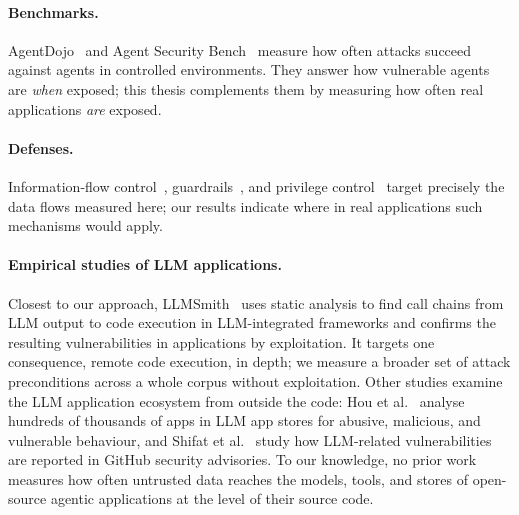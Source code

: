 \paragraph{Benchmarks.} AgentDojo~\cite{agentdojo} and Agent Security Bench~\cite{asb} measure how often attacks succeed against agents in controlled environments. They answer how vulnerable agents are \emph{when} exposed; this thesis complements them by measuring how often real applications \emph{are} exposed.

\paragraph{Defenses.} Information-flow control~\cite{debenedetti2025camel,costa2025fides}, guardrails~\cite{llamafirewall,xiang2024guardagent}, and privilege control~\cite{shi2025progent} target precisely the data flows measured here; our results indicate where in real applications such mechanisms would apply.

\paragraph{Empirical studies of LLM applications.} Closest to our approach, LLMSmith~\cite{liu2024llmsmith} uses static analysis to find call chains from LLM output to code execution in LLM-integrated frameworks and confirms the resulting vulnerabilities in applications by exploitation. It targets one consequence, remote code execution, in depth; we measure a broader set of attack preconditions across a whole corpus without exploitation. Other studies examine the LLM application ecosystem from outside the code: Hou et al.~\cite{hou2024llmappstores} analyse hundreds of thousands of apps in LLM app stores for abusive, malicious, and vulnerable behaviour, and Shifat et al.~\cite{shifat2026advisories} study how LLM-related vulnerabilities are reported in GitHub security advisories. To our knowledge, no prior work measures how often untrusted data reaches the models, tools, and stores of open-source agentic applications at the level of their source code.


